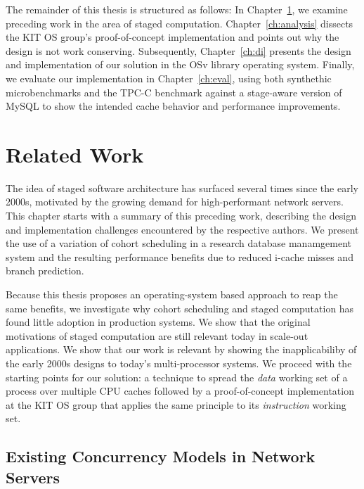 \documentclass[12pt,a4paper]{book}
\begin{document}
The remainder of this thesis is structured as follows:
In Chapter~\ref{ch:relwork}, we examine preceding work in the area of staged computation.
Chapter~\ref{ch:analysis} dissects the KIT OS group's proof-of-concept implementation and points out why the design is not work conserving.
Subsequently, Chapter~\ref{ch:di} presents the design and implementation of our solution in the OSv library operating system.
Finally, we evaluate our implementation in Chapter~\ref{ch:eval}, using both synthethic microbenchmarks and the TPC-C benchmark against a stage-aware version of MySQL to show the intended cache behavior and performance improvements.

\chapter{Related Work}\label{ch:relwork}
The idea of staged software architecture has surfaced several times since the early 2000s, motivated by the growing demand for high-performant network servers.
This chapter starts with a summary of this preceding work, describing the design and implementation challenges encountered by the respective authors.
We present the use of a variation of cohort scheduling in a research database manamgement system and the resulting performance benefits due to reduced i-cache misses and branch prediction.

Because this thesis proposes an operating-system based approach to reap the same benefits, we investigate why cohort scheduling and staged computation has found little adoption in production systems.
We show that the original motivations of staged computation are still relevant today in scale-out applications.
We show that our work is relevant by showing the inapplicabiliby of the early 2000s designs to today's multi-processor systems.
We proceed with the starting points for our solution: a technique to spread the \emph{data} working set of a process over multiple CPU caches followed by a proof-of-concept implementation at the KIT OS group that applies the same principle to its \emph{instruction} working set.


\section{Existing Concurrency Models in Network Servers}
\end{document}
